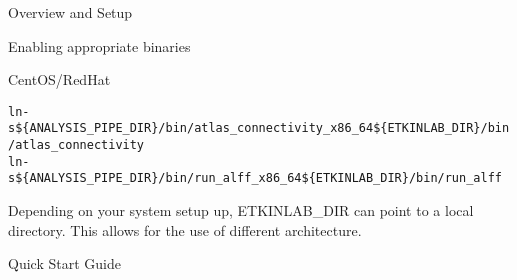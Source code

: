 \documentclass[]{report}
\begin{document}
\begin{chapter}{Overview and Setup}
\begin{section}{Enabling appropriate binaries}
\begin{subsubsection}{CentOS/RedHat}
\begin{alltt}
	ln -s \$\{ANALYSIS\_PIPE\_DIR\}/bin/atlas_connectivity_x86_64 \$\{ETKINLAB\_DIR\}/bin/atlas_connectivity
	ln -s \$\{ANALYSIS\_PIPE\_DIR\}/bin/run_alff_x86_64 \$\{ETKINLAB\_DIR\}/bin/run_alff
\end{alltt}

\end{subsubsection}

Depending on your system setup up, ETKINLAB\_DIR can point to a local directory. This allows for the use of different architecture.


\end{section}


\end{chapter}
\begin{chapter}{Quick Start Guide }


\end{chapter}
\end{document}
